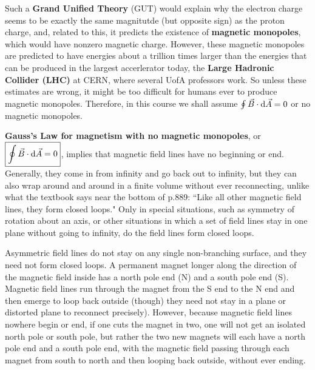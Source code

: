 Such a \textbf{Grand Unified Theory} (GUT) would explain why the electron charge seems to be exactly the same magnitutde (but opposite sign) as the proton charge, and, related to this, it predicts the existence of \textbf{magnetic monopoles}, which would have nonzero magnetic charge. However, these magnetic monopoles are predicted to have energies about a trillion times larger than the energies that can be produced in the largest accerlerator today, the \textbf{Large Hadronic Collider (LHC)} at CERN, where several UofA professors work. So unless these estimates are wrong, it might be too difficult for humans ever to produce magnetic monopoles. Therefore, in this course we shall assume $\oint \vec{B} \cdot \operatorname{d\!} \vec{A} = 0$ or no magnetic monopoles.

\textbf{Gauss's Law for magnetism with no magnetic monopoles}, or $\boxed{\oint \vec{B} \cdot \operatorname{d\!} \vec{A} = 0}$, implies that magnetic field lines have no beginning or end. Generally, they come in from infinity and go back out to infinity, but they can also wrap around and around in a finite volume without ever reconnecting, unlike what the textbook says near the bottom of p.889: ``Like all other magnetic field lines, they form closed loops." Only in special situations, such as symmetry of rotation about an axis, or other situations in which a set of field lines stay in one plane without going to infinity, do the field lines form closed loops.

Asymmetric field lines do not stay on any single non-branching surface, and they need not form closed loops. A permanent magnet longer along the direction of the magnetic field inside has a north pole end (N) and a south pole end (S). Magnetic field lines run through the magnet from the S end to the N end and then emerge to loop back outside (though) they need not stay in a plane or distorted plane to reconnect precisely). However, because magnetic field lines nowhere begin or end, if one cuts the magnet in two, one will not get an isolated north pole or south pole, but rather the two new magnets will each have a north pole end and a south pole end, with the magnetic field passing through each magnet from south to north and then looping back outside, without ever ending.

